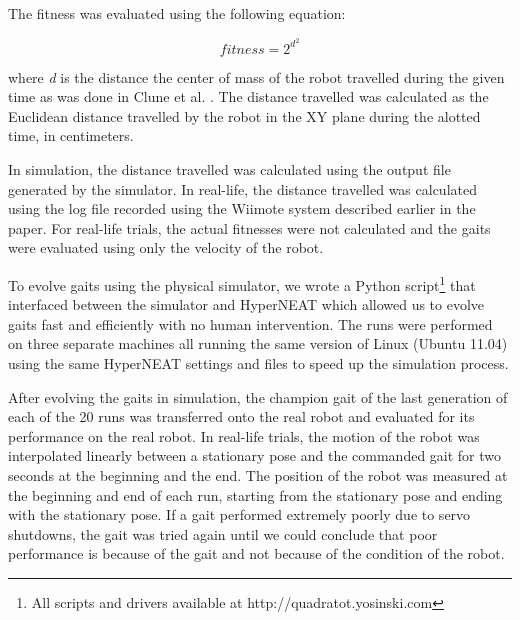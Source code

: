 The fitness was evaluated using the following equation:

\begin{equation}
fitness = 2^{d^{2}}
\end{equation}

where \emph{d} is the distance the center of mass of the robot travelled during the given time as was done in Clune et al. \cite{clune1}.
The distance travelled was calculated as the Euclidean distance travelled by the robot in the XY plane during the alotted time, in centimeters. 

In simulation, the distance travelled was calculated using the output file generated by the simulator.
In real-life, the distance travelled was calculated using the log file recorded using the Wiimote system described earlier in the paper. For real-life trials, the actual fitnesses were not calculated and the gaits were evaluated using only the velocity of the robot. 


To evolve gaits using the physical simulator, we wrote a Python script\footnote{All scripts and drivers available at http://quadratot.yosinski.com} that interfaced between the simulator and HyperNEAT which allowed us to evolve gaits fast and efficiently with no human intervention.
The runs were performed on three separate machines all running the same version of Linux (Ubuntu 11.04) using the same HyperNEAT settings and files to speed up the simulation process.


After evolving the gaits in simulation, the champion gait of the last generation of each of the 20 runs was transferred onto the real robot and evaluated for its performance on the real robot.
In real-life trials, the motion of the robot was interpolated linearly between a stationary pose and the commanded gait for two seconds at the beginning and the end. %
The position of the robot was measured at the beginning and end of each run, starting from the stationary pose and ending with the stationary pose. 
If a gait performed extremely poorly due to servo shutdowns, the gait was tried again until we could conclude that poor performance is because of the gait and not because of the condition of the robot.

